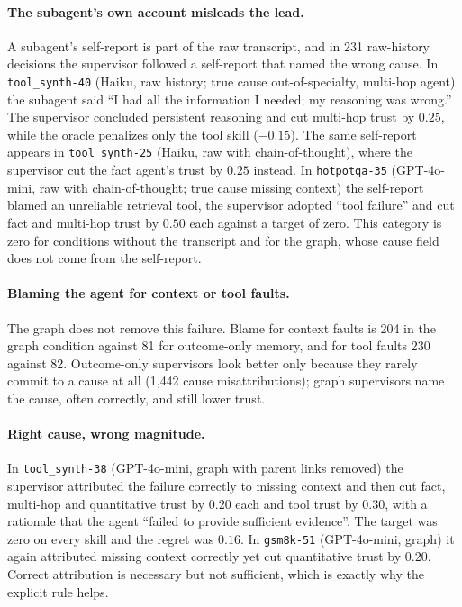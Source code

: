 \documentclass[letterpaper]{article}
\begin{document}
\paragraph{The subagent's own account misleads the lead.}
A subagent's self-report is part of the raw transcript, and in 231 raw-history decisions the supervisor followed a self-report that named the wrong cause. In \texttt{tool\_synth-40} (Haiku, raw history; true cause out-of-specialty, multi-hop agent) the subagent said ``I had all the information I needed; my reasoning was wrong.'' The supervisor concluded persistent reasoning and cut multi-hop trust by $0.25$, while the oracle penalizes only the tool skill ($-0.15$). The same self-report appears in \texttt{tool\_synth-25} (Haiku, raw with chain-of-thought), where the supervisor cut the fact agent's trust by $0.25$ instead. In \texttt{hotpotqa-35} (GPT-4o-mini, raw with chain-of-thought; true cause missing context) the self-report blamed an unreliable retrieval tool, the supervisor adopted ``tool failure'' and cut fact and multi-hop trust by $0.50$ each against a target of zero. This category is zero for conditions without the transcript and for the graph, whose cause field does not come from the self-report.

\paragraph{Blaming the agent for context or tool faults.}
The graph does not remove this failure. Blame for context faults is 204 in the graph condition against 81 for outcome-only memory, and for tool faults 230 against 82. Outcome-only supervisors look better only because they rarely commit to a cause at all (1{,}442 cause misattributions); graph supervisors name the cause, often correctly, and still lower trust.

\paragraph{Right cause, wrong magnitude.}
In \texttt{tool\_synth-38} (GPT-4o-mini, graph with parent links removed) the supervisor attributed the failure correctly to missing context and then cut fact, multi-hop and quantitative trust by $0.20$ each and tool trust by $0.30$, with a rationale that the agent ``failed to provide sufficient evidence''. The target was zero on every skill and the regret was $0.16$. In \texttt{gsm8k-51} (GPT-4o-mini, graph) it again attributed missing context correctly yet cut quantitative trust by $0.20$. Correct attribution is necessary but not sufficient, which is exactly why the explicit rule helps.
\end{document}
